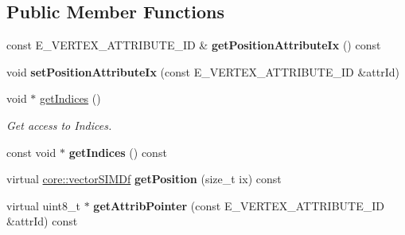 \subsection*{Public Member Functions}
\begin{DoxyCompactItemize}
\item 
const E\+\_\+\+V\+E\+R\+T\+E\+X\+\_\+\+A\+T\+T\+R\+I\+B\+U\+T\+E\+\_\+\+ID \& {\bfseries get\+Position\+Attribute\+Ix} () const \hypertarget{classirr_1_1scene_1_1ICPUMeshBuffer_a54c6d8ed3901b52b0fb7b189faa7a02b}{}\label{classirr_1_1scene_1_1ICPUMeshBuffer_a54c6d8ed3901b52b0fb7b189faa7a02b}

\item 
void {\bfseries set\+Position\+Attribute\+Ix} (const E\+\_\+\+V\+E\+R\+T\+E\+X\+\_\+\+A\+T\+T\+R\+I\+B\+U\+T\+E\+\_\+\+ID \&attr\+Id)\hypertarget{classirr_1_1scene_1_1ICPUMeshBuffer_ab77d7f76b288804c248448e82c04c84b}{}\label{classirr_1_1scene_1_1ICPUMeshBuffer_ab77d7f76b288804c248448e82c04c84b}

\item 
void $\ast$ \hyperlink{classirr_1_1scene_1_1ICPUMeshBuffer_a8d0f5fd79037531de1a70ea97da70269}{get\+Indices} ()
\begin{DoxyCompactList}\small\item\em Get access to Indices. \end{DoxyCompactList}\item 
const void $\ast$ {\bfseries get\+Indices} () const \hypertarget{classirr_1_1scene_1_1ICPUMeshBuffer_a6c53a614dfbd7580c3a9da8a06920731}{}\label{classirr_1_1scene_1_1ICPUMeshBuffer_a6c53a614dfbd7580c3a9da8a06920731}

\item 
virtual \hyperlink{classirr_1_1core_1_1vectorSIMDf}{core\+::vector\+S\+I\+M\+Df} {\bfseries get\+Position} (size\+\_\+t ix) const \hypertarget{classirr_1_1scene_1_1ICPUMeshBuffer_a969b13b257374c78872ffcbe2852b2b0}{}\label{classirr_1_1scene_1_1ICPUMeshBuffer_a969b13b257374c78872ffcbe2852b2b0}

\item 
virtual uint8\+\_\+t $\ast$ {\bfseries get\+Attrib\+Pointer} (const E\+\_\+\+V\+E\+R\+T\+E\+X\+\_\+\+A\+T\+T\+R\+I\+B\+U\+T\+E\+\_\+\+ID \&attr\+Id) const \hypertarget{classirr_1_1scene_1_1ICPUMeshBuffer_a92ef1ac64c0cb774062b029a3e9b7f4c}{}\label{classirr_1_1scene_1_1ICPUMeshBuffer_a92ef1ac64c0cb774062b029a3e9b7f4c}


\end{DoxyCompactItemize}
